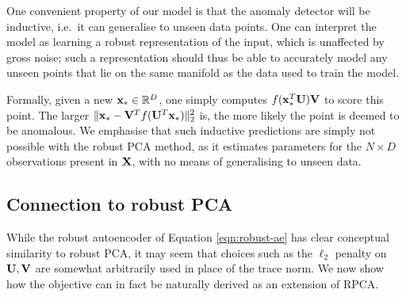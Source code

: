 One convenient property of our model is that the anomaly detector will be inductive, i.e.\ it can generalise to unseen data points.
One can interpret the model as learning a robust representation of the input, which is unaffected by gross noise;
such a representation should thus be able to accurately model any unseen points that lie on the same manifold as the data used to train the model.

Formally, given a new $\mathbf{x}_* \in \mathbb{R}^D$, one simply computes $f( \mathbf{x}_*^T \mathbf{U} ) \mathbf{V}$ to score this point.
The larger $\| \mathbf{x}_* - \mathbf{V}^T f( \mathbf{U}^T \mathbf{x}_* ) \|_2^2$ is, the more likely the point is deemed to be anomalous.
We emphasise that such inductive predictions are simply not possible with the robust PCA method, as it estimates parameters for the $N \times D$ observations present in $\mathbf{X}$, with no means of generalising to unseen data.



%
\subsection{Connection to robust PCA}

While the robust autoencoder of Equation \ref{eqn:robust-ae} has clear conceptual similarity to robust PCA,
it may seem that choices such as the $\ell_2$ penalty on $\mathbf{U}, \mathbf{V}$ are somewhat arbitrarily used in place of the trace norm.
We now show how the objective can in fact be naturally derived as an extension of RPCA.

